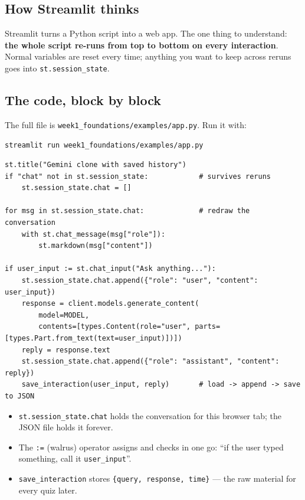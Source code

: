 
\subsection{How Streamlit thinks}
Streamlit turns a Python script into a web app. The one thing to understand: \textbf{the whole script re-runs from
top to bottom on every interaction}. Normal variables are reset every time; anything you want to keep across
reruns goes into \texttt{st.session\_state}.

\subsection{The code, block by block}
The full file is \nolinkurl{week1_foundations/examples/app.py}. Run it with:
\begin{lstlisting}[style=shell]
streamlit run week1_foundations/examples/app.py
\end{lstlisting}
\begin{lstlisting}
st.title("Gemini clone with saved history")
if "chat" not in st.session_state:            # survives reruns
    st.session_state.chat = []

for msg in st.session_state.chat:             # redraw the conversation
    with st.chat_message(msg["role"]):
        st.markdown(msg["content"])

if user_input := st.chat_input("Ask anything..."):
    st.session_state.chat.append({"role": "user", "content": user_input})
    response = client.models.generate_content(
        model=MODEL,
        contents=[types.Content(role="user", parts=[types.Part.from_text(text=user_input)])])
    reply = response.text
    st.session_state.chat.append({"role": "assistant", "content": reply})
    save_interaction(user_input, reply)       # load -> append -> save to JSON
\end{lstlisting}
\begin{itemize}
  \item \texttt{st.session\_state.chat} holds the conversation for this browser tab; the JSON file holds it forever.
  \item The \texttt{:=} (walrus) operator assigns and checks in one go: ``if the user typed something, call it \texttt{user\_input}''.
  \item \texttt{save\_interaction} stores \texttt{\{query, response, time\}} --- the raw material for every quiz later.
\end{itemize}

